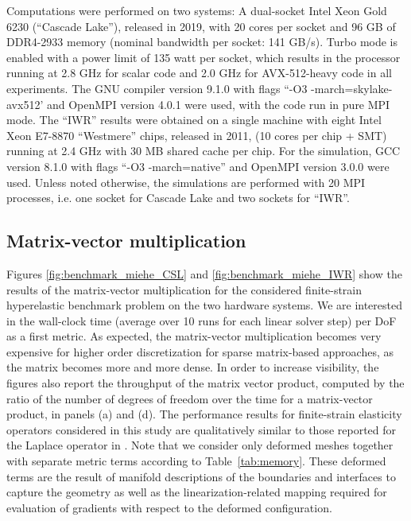 \documentclass[AMA,STIX1COL]{WileyNJD-v2}
\begin{document}
{\color{red}
Computations were performed on two systems: A dual-socket Intel Xeon Gold 6230 (``Cascade Lake''), released in 2019, with 20 cores per socket and 96 GB of DDR4-2933 memory (nominal bandwidth per socket: 141 GB/s). Turbo mode is enabled with a power limit of 135 watt per socket, which results in the processor running at 2.8 GHz for scalar code and 2.0 GHz for AVX-512-heavy code in all experiments. The GNU compiler version 9.1.0 with flags ``-O3 -march=skylake-avx512' and OpenMPI version 4.0.1 were used, with the code run in pure MPI mode.
}
The ``IWR'' results were obtained on a single machine with eight Intel Xeon E7-8870 ``Westmere'' chips, released in 2011, (10 cores per chip  + SMT) running at 2.4 GHz with 30 MB shared cache per chip. For the simulation, GCC version 8.1.0 with flags ``-O3 -march=native'' and OpenMPI version 3.0.0 were used.
Unless noted otherwise, the simulations are performed with 20 MPI processes, i.e. one socket for Cascade Lake and two sockets for ``IWR''.

\subsection{Matrix-vector multiplication}


Figures \ref{fig:benchmark_miehe_CSL} and \ref{fig:benchmark_miehe_IWR} show the results of the matrix-vector multiplication for the considered finite-strain hyperelastic benchmark problem on the two hardware systems.
We are interested in the wall-clock time (average over 10 runs for each linear solver step) per DoF as a first metric.
As expected, the matrix-vector multiplication becomes very expensive for higher order discretization for sparse matrix-based approaches,
as the matrix becomes more and more dense.
{\color{red}
In order to increase visibility, the figures also report the throughput of the matrix vector product, computed by the ratio of the number of degrees of freedom over the time for a matrix-vector product, in panels (a) and (d).
}
The performance results for finite-strain elasticity operators considered in this study are qualitatively similar to those reported for the Laplace operator in \cite{kronbichler12}.
{\color{red}
Note that we consider only deformed meshes together with separate metric terms according to Table~\ref{tab:memory}. These deformed terms are the result of manifold descriptions of the boundaries and interfaces  to capture the geometry as well as
the linearization-related mapping required for evaluation of gradients with respect to the deformed configuration.
}
\end{document}
